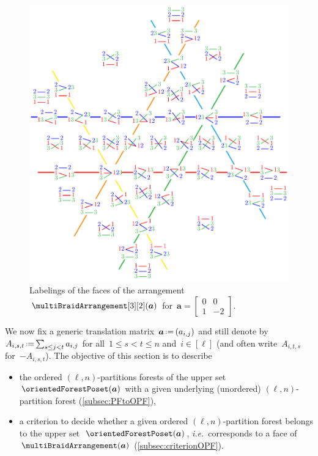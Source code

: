\documentclass{amsart}
\theoremstyle{definition}
\renewcommand{\b}[1]{{\boldsymbol{#1}}} %
\newcommand{\eqdef}{\mbox{\,\raisebox{0.2ex}{\scriptsize\ensuremath{\mathrm:}}\ensuremath{=}\,}} %
\newcommand{\ie}{\textit{i.e.}~} %
\renewcommand{\b}[1]{\boldsymbol{#1}} %
\begin{document}
\begin{figure}
	\centerline{\includegraphics[scale=.9]{B23b}}
	\caption{Labelings of the faces of the arrangement~$\multiBraidArrangement[3][2](\b{a})$ for~$\b{a} = \begin{bmatrix} 0 & 0 \\ 1 & -2 \end{bmatrix}$.}
	\label{fig:B23b}
\end{figure}

We now fix a generic translation matrix~$\b{a} \eqdef (a_{i,j})$ and still denote by~$A_{i,s,t} \eqdef \smash{\sum_{s \le j < t} a_{i,j}}$ for all~$1 \le s < t \le n$ and~$i \in [\ell]$ (and often write~$A_{i,t,s}$ for~$-A_{i,s,t}$).
The objective of this section is to describe
\begin{itemize}
\item the ordered $(\ell,n)$-partitions forests of the upper set~$\orientedForestPoset(\b{a})$ with a given underlying (unordered) $(\ell,n)$-partition forest (\cref{subsec:PFtoOPF}),
\item a criterion to decide whether a given ordered $(\ell,n)$-partition forest belongs to the upper set~$\orientedForestPoset(\b{a})$, \ie corresponds to a face of~$\multiBraidArrangement(\b{a})$ (\cref{subsec:criterionOPF}).
\end{itemize}
\end{document}
